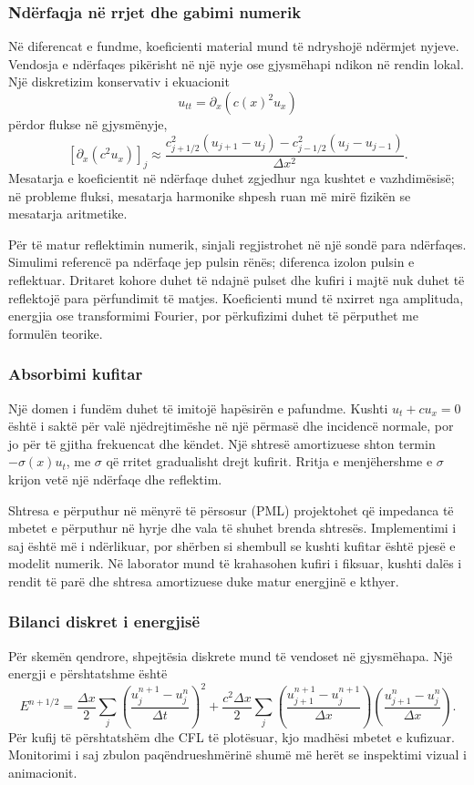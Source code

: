 \documentclass[11pt,oneside,openany]{book}
\begin{document}
\subsubsection{Ndërfaqja në rrjet dhe gabimi numerik}
Në diferencat e fundme, koeficienti material mund të ndryshojë ndërmjet nyjeve. Vendosja e ndërfaqes pikërisht në një nyje ose gjysmëhapi ndikon në rendin lokal. Një diskretizim konservativ i ekuacionit
\begin{equation}
 u_{tt}=\partial_x\left(c(x)^2u_x\right)
\end{equation}
përdor flukse në gjysmënyje,
\begin{equation}
 \left[\partial_x(c^2u_x)\right]_j
 \approx\frac{c_{j+1/2}^2(u_{j+1}-u_j)-c_{j-1/2}^2(u_j-u_{j-1})}{\Delta x^2}.
\end{equation}
Mesatarja e koeficientit në ndërfaqe duhet zgjedhur nga kushtet e vazhdimësisë; në probleme fluksi, mesatarja harmonike shpesh ruan më mirë fizikën se mesatarja aritmetike.

Për të matur reflektimin numerik, sinjali regjistrohet në një sondë para ndërfaqes. Simulimi referencë pa ndërfaqe jep pulsin rënës; diferenca izolon pulsin e reflektuar. Dritaret kohore duhet të ndajnë pulset dhe kufiri i majtë nuk duhet të reflektojë para përfundimit të matjes. Koeficienti mund të nxirret nga amplituda, energjia ose transformimi Fourier, por përkufizimi duhet të përputhet me formulën teorike.

\subsubsection{Absorbimi kufitar}
Një domen i fundëm duhet të imitojë hapësirën e pafundme. Kushti $u_t+cu_x=0$ është i saktë për valë njëdrejtimëshe në një përmasë dhe incidencë normale, por jo për të gjitha frekuencat dhe këndet. Një shtresë amortizuese shton termin $-\sigma(x)u_t$, me $\sigma$ që rritet gradualisht drejt kufirit. Rritja e menjëhershme e $\sigma$ krijon vetë një ndërfaqe dhe reflektim.

Shtresa e përputhur në mënyrë të përsosur (PML) projektohet që impedanca të mbetet e përputhur në hyrje dhe vala të shuhet brenda shtresës. Implementimi i saj është më i ndërlikuar, por shërben si shembull se kushti kufitar është pjesë e modelit numerik. Në laborator mund të krahasohen kufiri i fiksuar, kushti dalës i rendit të parë dhe shtresa amortizuese duke matur energjinë e kthyer.

\subsubsection{Bilanci diskret i energjisë}
Për skemën qendrore, shpejtësia diskrete mund të vendoset në gjysmëhapa. Një energji e përshtatshme është
\begin{equation}
 E^{n+1/2}=\frac{\Delta x}{2}\sum_j
 \left(\frac{u_j^{n+1}-u_j^n}{\Delta t}\right)^2
 +\frac{c^2\Delta x}{2}\sum_j
 \left(\frac{u_{j+1}^{n+1}-u_j^{n+1}}{\Delta x}\right)
 \left(\frac{u_{j+1}^{n}-u_j^{n}}{\Delta x}\right).
\end{equation}
Për kufij të përshtatshëm dhe CFL të plotësuar, kjo madhësi mbetet e kufizuar. Monitorimi i saj zbulon paqëndrueshmërinë shumë më herët se inspektimi vizual i animacionit.
\end{document}
